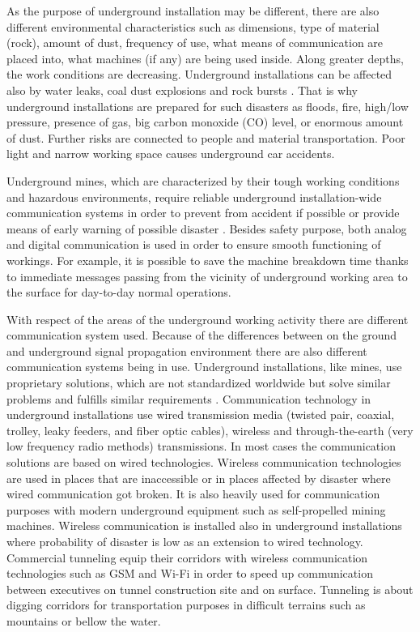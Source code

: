 \documentclass[../main.tex]{subfiles}
\begin{document}
As the purpose of underground installation may be different, there are also different environmental characteristics such as dimensions, type of material (rock), amount of dust, frequency of use, what means of communication are placed into, what machines (if any) are being used inside. Along greater depths, the work conditions are decreasing.  Underground installations can be affected also by water leaks, coal dust explosions and rock bursts \cite{WSN_monitoring}. That is why underground installations are prepared for such disasters as floods, fire, high/low pressure, presence of gas, big carbon monoxide (CO) level, or enormous amount of dust. Further risks are connected to people and material transportation. Poor light and narrow working space causes underground car accidents.

Underground mines, which are characterized by their tough working conditions and hazardous environments, require reliable underground installation-wide communication systems in order to prevent from accident if possible or provide means of early warning of possible disaster \cite{Book_wireless_in_mines}. Besides safety purpose, both analog and digital communication is used in order to ensure smooth functioning of workings. For example, it is possible to save the machine breakdown time thanks to immediate messages passing from the vicinity of underground working area to the surface for day-to-day normal operations.

With respect of the areas of the underground working activity there are different communication system used. Because of the differences between on the ground and underground signal propagation environment there are also different communication systems being in use. Underground installations, like mines, use proprietary solutions, which are not standardized worldwide but solve similar problems and fulfills similar requirements \cite{article-wireless-undeground-critics}\cite{article_mine_communications_safety}. Communication technology in underground installations use wired transmission media (twisted pair, coaxial, trolley, leaky feeders, and fiber optic cables), wireless and through-the-earth (very low frequency radio methods) transmissions. In most cases the communication solutions are based on wired technologies. Wireless communication technologies are used in places that are inaccessible or in places affected by disaster where wired communication got broken. It is also heavily used for communication purposes with modern underground equipment such as self-propelled mining machines\cite{Thesis_CM}. Wireless communication is installed also in underground installations where probability of disaster is low as an extension to wired technology. Commercial tunneling equip their corridors with wireless communication technologies such as GSM and Wi-Fi in order to speed up communication between executives on tunnel construction site and on surface\cite{Book_wireless_in_mines}\cite{article_rf_propagation_practical_full}\cite{article_mine_communications_3_characteristics}. Tunneling is about digging corridors for transportation purposes in difficult terrains such as mountains or bellow the water.
\end{document}
